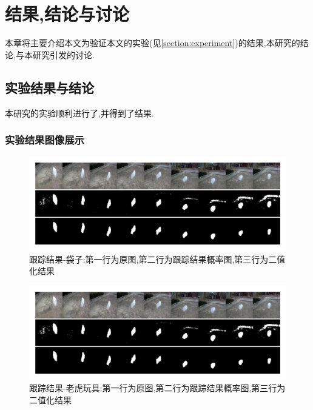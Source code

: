 
\chapter{结果,结论与讨论}
本章将主要介绍本文为验证本文的实验(见\ref{section:experiment})的结果,本研究的结论,与本研究引发的讨论.
\section{实验结果与结论}
本研究的实验顺利进行了,并得到了结果.
\subsection{实验结果图像展示}
\par
\begin{figure}
    \centering
    \includegraphics[width = 1.\textwidth]{chap/img/result_bag.pdf}
    \caption{跟踪结果-袋子:第一行为原图,第二行为跟踪结果概率图,第三行为二值化结果}
    \label{fig:result_bag}
\end{figure}
\par
\begin{figure}
    \centering
    \includegraphics[width = 1.\textwidth]{chap/img/result_bag.pdf}
    \caption{跟踪结果-老虎玩具:第一行为原图,第二行为跟踪结果概率图,第三行为二值化结果}
    \label{fig:result_tiger}
\end{figure}
\par
